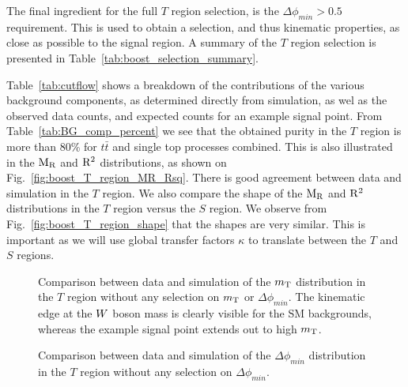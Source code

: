 The final ingredient for the full $T$ region selection, is the $\Delta\phi_{min} > 0.5$
requirement. This is used to obtain a selection, and thus kinematic properties, as close as
possible to the signal region. A summary of the $T$ region selection is presented in
Table~\ref{tab:boost_selection_summary}. 

Table~\ref{tab:cutflow} shows a breakdown of the contributions of the various background components,
as determined directly from simulation, as wel as the observed data counts, and expected counts for
an example signal point. From Table~\ref{tab:BG_comp_percent} we see that the obtained purity in the
$T$ region is more than 80\% for $t\bar{t}$ and single top processes combined. This is also
illustrated in the $\mathrm{M_R}$ and $\mathrm{R^2}$ distributions, as shown on Fig.~\ref{fig:boost_T_region_MR_Rsq}.
There is good agreement between data and simulation in the $T$ region. 
We also compare the shape of the $\mathrm{M_R}$ and $\mathrm{R^2}$ distributions in the $T$ region versus the $S$
region. We observe from Fig.~\ref{fig:boost_T_region_shape} that the shapes are very similar. This
is important as we will use global transfer factors $\kappa$ to translate between the $T$ and $S$
regions. 




\begin{figure}[htbp]
\centering
\caption{Comparison between data and simulation of the $m_{\mathrm{T}}$ distribution in the $T$ region without
any selection on $m_{\mathrm{T}}$ or $\Delta\phi_{min}$. The kinematic edge at the $W$ boson mass is clearly
visible for the SM backgrounds, whereas the example signal point extends out to high $m_{\mathrm{T}}$.
\label{fig:boost_T_region_mT}}
\end{figure}

\begin{figure}[htbp]
\centering
\caption{Comparison between data and simulation of the $\Delta\phi_{min}$ distribution in the $T$
region without any selection on $\Delta\phi_{min}$.
\label{fig:boost_T_region_mindeltaphi}}
\end{figure}


